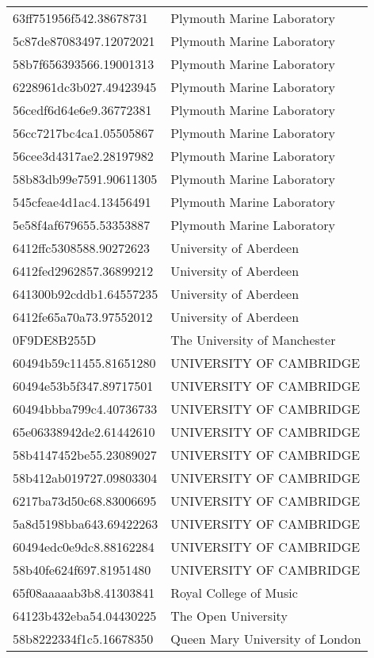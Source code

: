 \begin{tabular}{ll}
63ff751956f542.38678731 & Plymouth Marine Laboratory \\
5c87de87083497.12072021 & Plymouth Marine Laboratory \\
58b7f656393566.19001313 & Plymouth Marine Laboratory \\
6228961dc3b027.49423945 & Plymouth Marine Laboratory \\
56cedf6d64e6e9.36772381 & Plymouth Marine Laboratory \\
56cc7217bc4ca1.05505867 & Plymouth Marine Laboratory \\
56cee3d4317ae2.28197982 & Plymouth Marine Laboratory \\
58b83db99e7591.90611305 & Plymouth Marine Laboratory \\
545cfeae4d1ac4.13456491 & Plymouth Marine Laboratory \\
5e58f4af679655.53353887 & Plymouth Marine Laboratory \\
6412ffc5308588.90272623 & University of Aberdeen \\
6412fed2962857.36899212 & University of Aberdeen \\
641300b92cddb1.64557235 & University of Aberdeen \\
6412fe65a70a73.97552012 & University of Aberdeen \\
0F9DE8B255D & The University of Manchester \\
60494b59c11455.81651280 & UNIVERSITY OF CAMBRIDGE \\
60494e53b5f347.89717501 & UNIVERSITY OF CAMBRIDGE \\
60494bbba799c4.40736733 & UNIVERSITY OF CAMBRIDGE \\
65e06338942de2.61442610 & UNIVERSITY OF CAMBRIDGE \\
58b4147452be55.23089027 & UNIVERSITY OF CAMBRIDGE \\
58b412ab019727.09803304 & UNIVERSITY OF CAMBRIDGE \\
6217ba73d50c68.83006695 & UNIVERSITY OF CAMBRIDGE \\
5a8d5198bba643.69422263 & UNIVERSITY OF CAMBRIDGE \\
60494edc0e9dc8.88162284 & UNIVERSITY OF CAMBRIDGE \\
58b40fe624f697.81951480 & UNIVERSITY OF CAMBRIDGE \\
65f08aaaaab3b8.41303841 & Royal College of Music \\
64123b432eba54.04430225 & The Open University \\
58b8222334f1c5.16678350 & Queen Mary University of London \\

\end{tabular}
